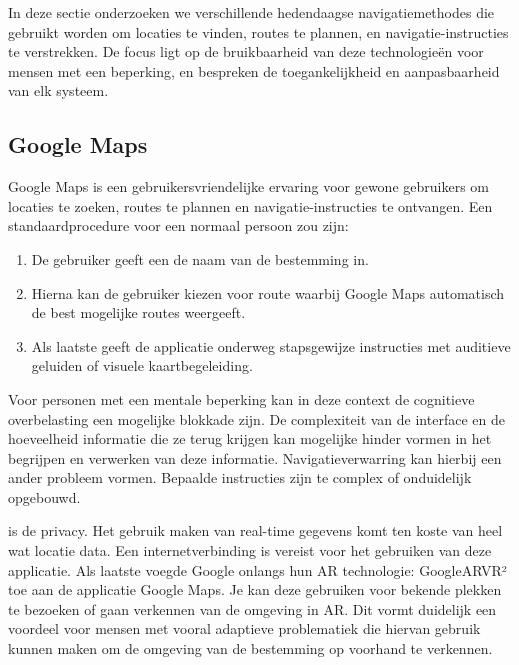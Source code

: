 In deze sectie onderzoeken we verschillende hedendaagse navigatiemethodes die gebruikt worden om locaties te vinden, routes te plannen, en navigatie-instructies te verstrekken. De focus ligt op de bruikbaarheid van deze technologieën voor mensen met een beperking, en bespreken de toegankelijkheid en aanpasbaarheid van elk systeem.

\subsection{Google Maps}
\label{sec:google-maps}


Google Maps is een gebruikersvriendelijke ervaring voor gewone gebruikers om locaties te zoeken, routes te plannen en navigatie-instructies te ontvangen. Een standaardprocedure voor een normaal persoon zou zijn:

\begin{enumerate}
    \item De gebruiker geeft een de naam van de bestemming in.
    \item Hierna kan de gebruiker kiezen voor route waarbij Google Maps automatisch de best mogelijke routes weergeeft.
    \item Als laatste geeft de applicatie onderweg stapsgewijze instructies met auditieve geluiden of visuele kaartbegeleiding.
\end{enumerate}

Voor personen met een mentale beperking kan in deze context de cognitieve overbelasting een mogelijke blokkade zijn. De complexiteit van de interface en de hoeveelheid informatie die ze terug krijgen kan mogelijke hinder vormen in het begrijpen en verwerken van deze informatie. Navigatieverwarring kan hierbij een ander probleem vormen. Bepaalde instructies zijn te complex of onduidelijk opgebouwd.

is de privacy. Het gebruik maken van real-time gegevens komt ten koste van heel wat locatie data. Een internetverbinding is vereist voor het gebruiken van deze applicatie. Als laatste voegde Google onlangs hun AR technologie: GoogleARVR² toe aan de applicatie Google Maps. Je kan deze gebruiken voor bekende plekken te bezoeken of gaan verkennen van de omgeving in AR. Dit vormt duidelijk een voordeel voor mensen met vooral adaptieve problematiek die hiervan gebruik kunnen maken om de omgeving van de bestemming op voorhand te verkennen.

